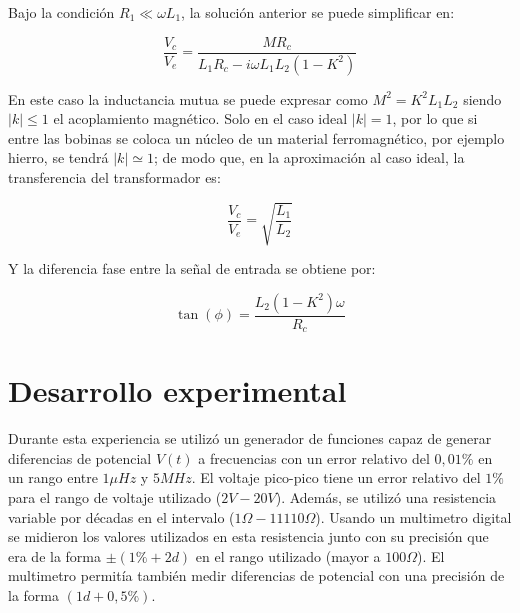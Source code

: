 \documentclass[11pt,a4paper]{article}
\begin{document}
Bajo la condición $R_1 \ll \omega L_1$, la solución anterior se puede simplificar en:

\begin{equation}
\frac{V_c}{V_e}=\frac{MR_c}{L_1R_c-i\omega L_1L_2(1-K^2)}
\label{transf_2}
\end{equation}

En este caso la inductancia mutua se puede expresar como $M^2=K^2L_1L_2$ siendo $\vert k\vert\leq1$ el acoplamiento magnético. Solo en el caso ideal $\vert k\vert = 1$, por lo que si entre las bobinas se coloca un núcleo de un material ferromagnético, por ejemplo hierro, se tendrá $\vert k\vert \simeq 1$; de modo que, en la aproximación al caso ideal, la transferencia del transformador es:

\begin{equation}
\frac{V_c}{V_e}= \sqrt{\frac{L_1}{L_2}}
\label{trans_3}
\end{equation}

Y la diferencia fase entre la señal de entrada se obtiene por:

\begin{equation}
\tan(\phi) = \frac{L_2 (1-K^2)\omega}{R_c}
\label{eq:fase_trans}
\end{equation}


\section{Desarrollo experimental}

Durante esta experiencia se utilizó un generador de funciones capaz de generar diferencias de potencial $V(t)$ a frecuencias con un error relativo del $0,01\%$ en un rango entre $1\mu Hz$ y $5MHz$. El voltaje pico-pico tiene un error relativo del $1\%$ para el rango de voltaje utilizado ($2V-20V$). Además, se utilizó una resistencia variable por décadas en el intervalo ($1\Omega-11110\Omega$). Usando un multimetro digital se midieron los valores utilizados en esta resistencia junto con su precisión que era de la forma $\pm(1\%+2d)$ en el rango utilizado (mayor a $100\Omega$). El multimetro permitía también medir diferencias de potencial con una precisión de la forma $(1d+0,5\%)$.
\end{document}
